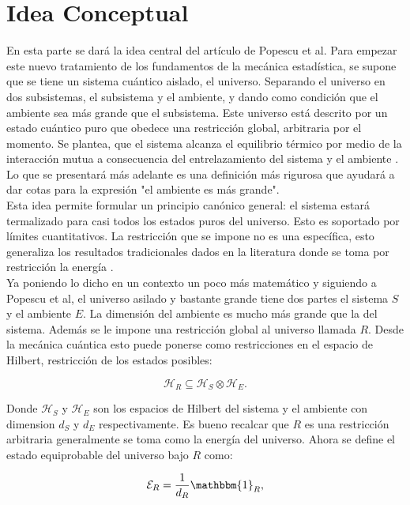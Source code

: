 \section{Idea Conceptual}
En esta parte se dará la idea central del artículo de Popescu et al. Para empezar este nuevo tratamiento de los fundamentos de la mecánica estadística, se supone que se tiene un sistema cuántico aislado, el universo. Separando el universo en dos subsistemas, el subsistema y el ambiente, y dando como condición que el ambiente sea más grande que el subsistema. Este universo está descrito por un estado cuántico puro que obedece una restricción global, arbitraria por el momento. Se plantea, que el sistema alcanza el equilibrio térmico por medio de la interacción mutua a consecuencia del entrelazamiento del sistema y el ambiente  \cite{Popescu2006}. Lo que se presentará más adelante es una definición más rigurosa que ayudará a dar cotas para la expresión "el ambiente es más grande".
\\
Esta idea permite formular un principio canónico general: el sistema estará termalizado para casi todos los estados puros del universo. Esto es soportado por límites cuantitativos. La restricción que se impone no es una específica, esto generaliza los resultados tradicionales dados en la literatura donde se toma por restricción la energía \cite{KardarStat}.
\\
Ya poniendo lo dicho en un contexto un poco más matemático y siguiendo a Popescu et al, el universo asilado y bastante grande tiene dos partes el sistema $S$ y el ambiente $E$. La dimensión del ambiente es mucho más grande que la del sistema. Además se le impone una restricción global al universo llamada $R$. Desde la mecánica cuántica esto puede ponerse como restricciones en el espacio de Hilbert, restricción de los estados posibles:

\begin{equation}
\mathcal{H}_{R}\subseteq \mathcal{H}_{S}\otimes \mathcal{H}_{E}.
\end{equation}

Donde $\mathcal{H}_{S}$ y $\mathcal{H}_{E}$ son los espacios de Hilbert del sistema y el ambiente con dimension $d_{S}$  y $d_{E}$ respectivamente. Es bueno recalcar que $R$ es una restricción arbitraria generalmente se toma como la energía del universo. Ahora se define el estado equiprobable del universo bajo $R$ como:

\begin{equation}
\mathcal{E}_{R} = \frac{1}{d_{R}} \mathbbm{1}_{R},
\end{equation}

